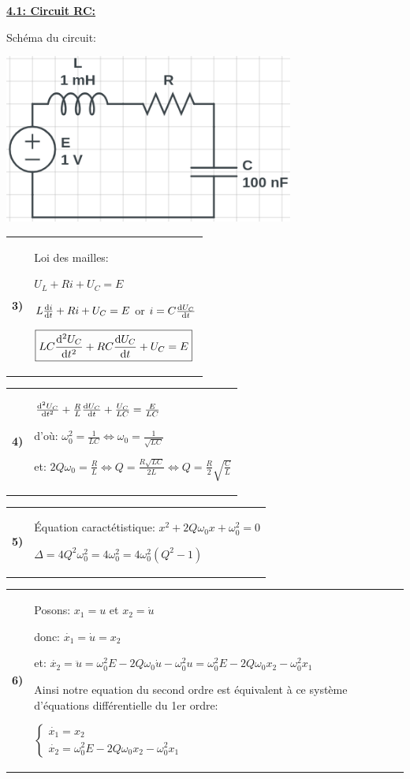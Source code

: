 \documentclass{article}
\newcommand{\question}[2]
{
    \begin{tabularx}{\linewidth}{lX}
        \textbf{#1)} & {#2}
    \end{tabularx} 
}
\newcommand{\expart}[1]
{
    \textbf{\underline{#1:}} \par 
}
\begin{document}
\expart{4.1: Circuit RC}
{
    Schéma du circuit:

    \begin{center}
      \includegraphics[height=15em]{images/rlc_schema.png}
    \end{center}

    \question{3}{
      Loi des mailles:

      $U_L+Ri+U_C=E$

      $L\dv{i}{t}+Ri+U_C=E$ or $i=C\dv{U_C}{t}$
      
      $\boxed{LC\dv[2]{U_C}{t}+RC\dv{U_C}{t}+U_C=E}$
    }

    \question{4}{
      $\dv[2]{U_C}{t}+\frac{R}{L}\dv{U_C}{t}+\frac{U_C}{LC}=\frac{E}{LC}$

      d'où: $\omega_0^2=\frac{1}{LC} \Longleftrightarrow \boxed{\omega_0=\frac{1}{\sqrt{LC}}}$

      et: $2Q\omega_0=\frac{R}{L} \Longleftrightarrow Q=\frac{R\sqrt{LC}}{2L} \Longleftrightarrow \boxed{Q=\frac{R}{2}\sqrt{\frac{C}{L}}}$
    }

    \question{5}{
      Équation caractétistique:
      $x^2+2Q\omega_0x+\omega_0^2=0$

      $\Delta=4Q^2\omega_0^2=4\omega_0^2=4\omega_0^2(Q^2-1)$

      \fbox{\begin{minipage}{1.0\textwidth}
          - \textbf{Apériodique} si: $\Delta>0 \Longleftrightarrow Q^2>1 \Longleftrightarrow Q>1 \Longleftrightarrow R>2\sqrt{\frac{L}{C}}$

          - \textbf{Critique} si: $\Delta=0 \Longleftrightarrow Q=1 \Longleftrightarrow R=2\sqrt{\frac{L}{C}}$

          - \textbf{Pseudo-périodique} si: $\Delta<0 \Longleftrightarrow Q<1 \Longleftrightarrow R<2\sqrt{\frac{L}{C}}$
      \end{minipage}}
    }

    \question{6}{
      Posons: $x_1=u$ et $x_2=\dot{u}$

      donc: $\dot{x_1}=\dot{u}=x_2$

      et: $\dot{x_2}=\ddot{u}=\omega_0^2E-2Q\omega_0\dot{u}-\omega_0^2u=\omega_0^2E-2Q\omega_0x_2-\omega_0^2x_1$

      Ainsi notre equation du second ordre est équivalent à ce système d'équations différentielle du 1er ordre:
      
      $\boxed{\begin{cases}
        \dot{x_1}=x_2 \\
        \dot{x_2}=\omega_0^2E-2Q\omega_0x_2-\omega_0^2x_1
      \end{cases}}$
    }
}
\end{document}
